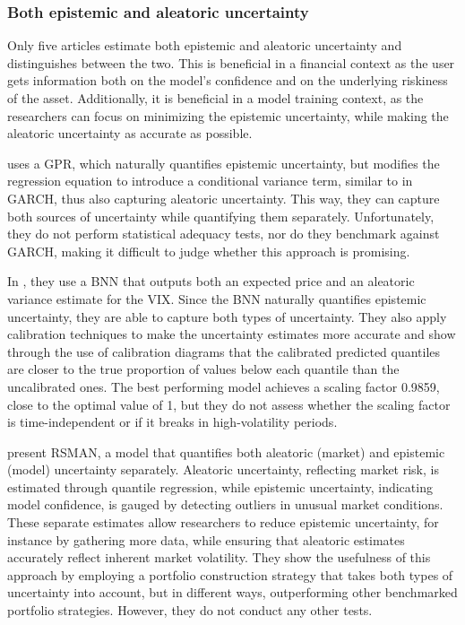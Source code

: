 \subsubsection{Both epistemic and aleatoric uncertainty}

Only five articles estimate both epistemic and aleatoric uncertainty and distinguishes between the two. This is beneficial in a financial context as the user gets information both on the model's confidence and on the underlying riskiness of the asset. Additionally, it is beneficial in a model training context, as the researchers can focus on minimizing the epistemic uncertainty, while making the aleatoric uncertainty as accurate as possible.

\textcite{Risk2018gpr} uses a GPR, which naturally quantifies epistemic uncertainty, but modifies the regression equation to introduce a conditional variance term, similar to in GARCH, thus also capturing aleatoric uncertainty. This way, they can capture both sources of uncertainty while quantifying them separately. Unfortunately, they do not perform statistical adequacy tests, nor do they benchmark against GARCH, making it difficult to judge whether this approach is promising.

In \textcite{hortua2024forecasting}, they use a BNN that outputs both an expected price and an aleatoric variance estimate for the VIX. Since the BNN naturally quantifies epistemic uncertainty, they are able to capture both types of uncertainty. They also apply calibration techniques to make the uncertainty estimates more accurate and show through the use of calibration diagrams that the calibrated predicted quantiles are closer to the true proportion of values below each quantile than the uncalibrated ones. The best performing model achieves a scaling factor 0.9859, close to the optimal value of 1, but they do not assess whether the scaling factor is time-independent or if it breaks in high-volatility periods.


\textcite{Park2024UncertaintyAware} present RSMAN, a model that quantifies both aleatoric (market) and epistemic (model) uncertainty separately. Aleatoric uncertainty, reflecting market risk, is estimated through quantile regression, while epistemic uncertainty, indicating model confidence, is gauged by detecting outliers in unusual market conditions. These separate estimates allow researchers to reduce epistemic uncertainty, for instance by gathering more data, while ensuring that aleatoric estimates accurately reflect inherent market volatility. They show the usefulness of this approach by employing a portfolio construction strategy that takes both types of uncertainty into account, but in different ways, outperforming other benchmarked portfolio strategies. However, they do not conduct any other tests.

